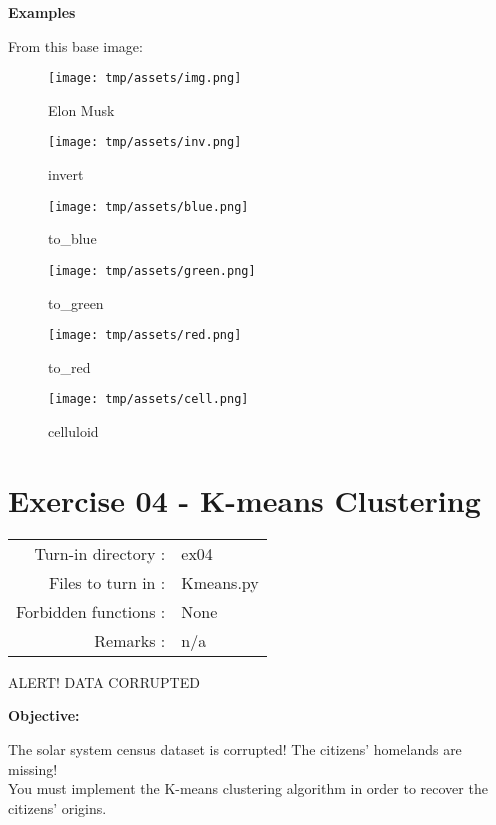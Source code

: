 \documentclass[]{article}
\begin{document}
\textbf{Examples}

From this base image:

\begin{figure}
\centering
\texttt{[image: tmp/assets/img.png]}
\caption{Elon Musk}
\end{figure}

\begin{figure}
\centering
\texttt{[image: tmp/assets/inv.png]}
\caption{invert}
\end{figure}

\begin{figure}
\centering
\texttt{[image: tmp/assets/blue.png]}
\caption{to\_blue}
\end{figure}

\begin{figure}
\centering
\texttt{[image: tmp/assets/green.png]}
\caption{to\_green}
\end{figure}

\begin{figure}
\centering
\texttt{[image: tmp/assets/red.png]}
\caption{to\_red}
\end{figure}

\begin{figure}
\centering
\texttt{[image: tmp/assets/cell.png]}
\caption{celluloid}
\end{figure}

\clearpage

\hypertarget{exercise-04---k-means-clustering-1}{%
\section{Exercise 04 - K-means
Clustering}\label{exercise-04---k-means-clustering-1}}

\begin{longtable}[]{@{}rl@{}}
\toprule
\endhead
Turn-in directory : & ex04\tabularnewline
Files to turn in : & Kmeans.py\tabularnewline
Forbidden functions : & None\tabularnewline
Remarks : & n/a\tabularnewline
\bottomrule
\end{longtable}

ALERT! DATA CORRUPTED

\textbf{Objective:}

The solar system census dataset is corrupted! The citizens' homelands
are missing!\\
You must implement the K-means clustering algorithm in order to recover
the citizens' origins.
\end{document}
